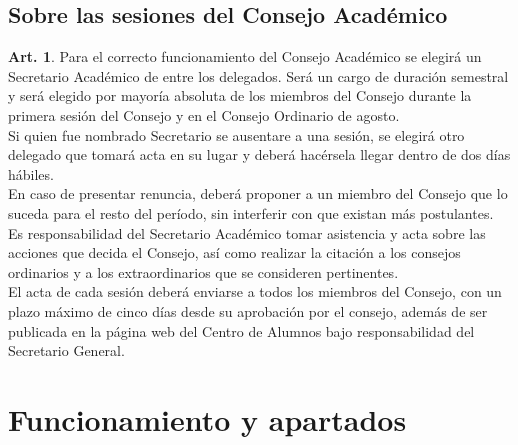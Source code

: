 \documentclass[letterpaper,11pt]{article}
\theoremstyle{definition}%
\newtheorem{art}{Art.} %
\begin{document}
\subsection*{Sobre las sesiones del Consejo Académico}


\begin{art}
	Para el correcto funcionamiento del Consejo Académico se elegirá un Secretario Académico de entre los delegados. Será un cargo de duración semestral y será elegido por mayoría absoluta de los miembros del Consejo durante la primera sesión del Consejo  y en el Consejo Ordinario de agosto.
	\\
	Si quien fue nombrado Secretario se ausentare a una sesión, se elegirá otro delegado que tomará acta en su lugar y deberá hacérsela llegar dentro de dos días hábiles.
	\\
	En caso de presentar renuncia, deberá proponer a un miembro del Consejo que lo suceda para el resto del período, sin interferir con que existan más postulantes.
	\\
	Es responsabilidad del Secretario Académico tomar asistencia y acta sobre las acciones que decida el Consejo, así como realizar la citación a los consejos ordinarios y a los extraordinarios que se consideren pertinentes.
	\\
	El acta de cada sesión deberá enviarse a todos los miembros del Consejo, con un plazo máximo de cinco días  desde su aprobación por el consejo, además de ser publicada en la página web del Centro de Alumnos bajo responsabilidad del Secretario General.
\end{art}

\section{Funcionamiento y apartados}
\end{document}
